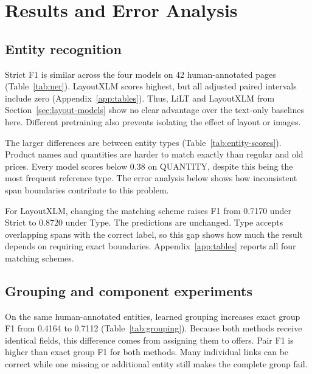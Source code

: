 \section{Results and Error Analysis}\label{sec:results}
\subsection{Entity recognition}
Strict F1 is similar across the four models on 42 human-annotated pages (Table~\ref{tab:ner}). LayoutXLM scores highest, but all adjusted paired intervals include zero (Appendix~\ref{app:tables}). Thus, LiLT and LayoutXLM from Section~\ref{sec:layout-models} show no clear advantage over the text-only baselines here. Different pretraining also prevents isolating the effect of layout or images.

\begin{table}[htbp]
\centering\small
\caption{Entity recognition against the human reference. Scores pool counts across the 42 pages. Intervals are individual 95\% cluster intervals.}\label{tab:ner}

\end{table}

\begin{table}[htbp]
\centering\small
\caption{Strict F1 by entity type on the same 42 human-annotated pages. Both word boundaries and entity type must match. The reference count gives the number of annotated entities of each type.}\label{tab:entity-scores}

\end{table}

The larger differences are between entity types (Table~\ref{tab:entity-scores}). Product names and quantities are harder to match exactly than regular and old prices. Every model scores below 0.38 on QUANTITY, despite this being the most frequent reference type. The error analysis below shows how inconsistent span boundaries contribute to this problem.

For LayoutXLM, changing the matching scheme raises F1 from 0.7170 under Strict to 0.8720 under Type. The predictions are unchanged. Type accepts overlapping spans with the correct label, so this gap shows how much the result depends on requiring exact boundaries. Appendix~\ref{app:tables} reports all four matching schemes.

\subsection{Grouping and component experiments}\label{sec:grouping-results}
On the same human-annotated entities, learned grouping increases exact group F1 from 0.4164 to 0.7112 (Table~\ref{tab:grouping}). Because both methods receive identical fields, this difference comes from assigning them to offers. Pair F1 is higher than exact group F1 for both methods. Many individual links can be correct while one missing or additional entity still makes the complete group fail.

